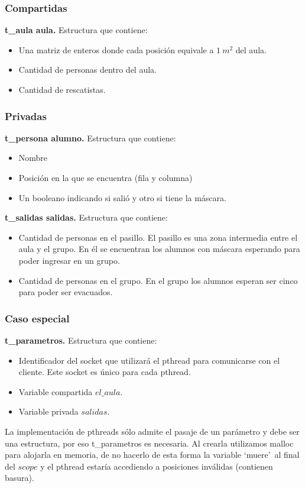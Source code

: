 \subsubsection{Compartidas}
\textbf{t\_aula aula.}
Estructura que contiene: 
\begin{itemize}
 \item Una matriz de enteros donde cada posición equivale a $1\ m^{2}$ del aula.
 \item Cantidad de personas dentro del aula.
 \item Cantidad de rescatistas.
\end{itemize}

\subsubsection{Privadas}
\textbf{t\_persona alumno.}
Estructura que contiene: 
\begin{itemize}
 \item Nombre
 \item Posición en la que se encuentra (fila y columna)
 \item Un booleano indicando si salió y otro si tiene la máscara.
\end{itemize}

\smallskip
\textbf{t\_salidas salidas.}
Estructura que contiene: 
\begin{itemize}
 \item Cantidad de personas en el pasillo. 
 El pasillo es una zona intermedia entre el aula y el grupo. En él se encuentran 
 los alumnos con máscara esperando para poder ingresar en un grupo.
 \item Cantidad de personas en el grupo. 
 En el grupo los alumnos esperan ser cinco para poder ser evacuados.
\end{itemize}

\subsubsection{Caso especial}
\textbf{t\_parametros.} 
Estructura que contiene: 
\begin{itemize}
 \item Identificador del socket que utilizará el pthread para comunicarse con el cliente.
 Este socket es único para cada pthread.
 \item Variable compartida $el\_ aula$.
 \item Variable privada $salidas$.
\end{itemize}

La implementación de pthreads sólo admite el pasaje de un parámetro y debe
ser una estructura, por eso t\_parametros es necesaria. Al crearla utilizamos malloc para alojarla en memoria, 
de no hacerlo de esta forma la variable \textquoteleft muere\textquoteright\, al final del $scope$ y
el pthread estaría accediendo a posiciones inválidas (contienen basura).